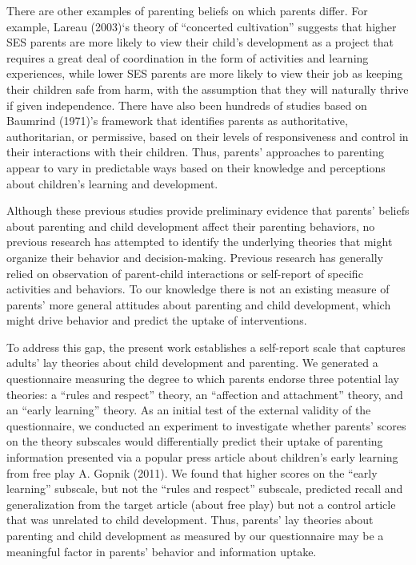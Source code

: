 \documentclass[10pt, letterpaper]{article}
\begin{document}
There are other examples of parenting beliefs on which parents differ.
For example, Lareau (2003)`s theory of ``concerted cultivation''
suggests that higher SES parents are more likely to view their child's
development as a project that requires a great deal of coordination in
the form of activities and learning experiences, while lower SES parents
are more likely to view their job as keeping their children safe from
harm, with the assumption that they will naturally thrive if given
independence. There have also been hundreds of studies based on Baumrind
(1971)'s framework that identifies parents as authoritative,
authoritarian, or permissive, based on their levels of responsiveness
and control in their interactions with their children. Thus, parents'
approaches to parenting appear to vary in predictable ways based on
their knowledge and perceptions about children's learning and
development.

Although these previous studies provide preliminary evidence that
parents' beliefs about parenting and child development affect their
parenting behaviors, no previous research has attempted to identify the
underlying theories that might organize their behavior and
decision-making. Previous research has generally relied on observation
of parent-child interactions or self-report of specific activities and
behaviors. To our knowledge there is not an existing measure of parents'
more general attitudes about parenting and child development, which
might drive behavior and predict the uptake of interventions.

To address this gap, the present work establishes a self-report scale
that captures adults' lay theories about child development and
parenting. We generated a questionnaire measuring the degree to which
parents endorse three potential lay theories: a ``rules and respect''
theory, an ``affection and attachment'' theory, and an ``early
learning'' theory. As an initial test of the external validity of the
questionnaire, we conducted an experiment to investigate whether
parents' scores on the theory subscales would differentially predict
their uptake of parenting information presented via a popular press
article about children's early learning from free play A. Gopnik (2011).
We found that higher scores on the ``early learning'' subscale, but not
the ``rules and respect'' subscale, predicted recall and generalization
from the target article (about free play) but not a control article that
was unrelated to child development. Thus, parents' lay theories about
parenting and child development as measured by our questionnaire may be
a meaningful factor in parents' behavior and information uptake.
\end{document}
